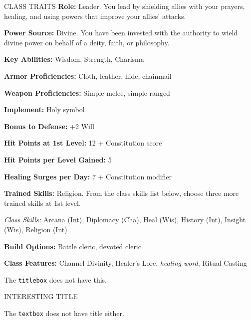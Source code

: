 \documentclass{article}
\begin{document}
\begin{traitsbox}{CLASS TRAITS}
	\textbf{Role:} Leader. You lead by shielding allies with your prayers, healing, and using powers that improve your allies’ attacks.


	\textbf{Power Source:} Divine. You have been invested with the authority to wield divine power on behalf of a deity, faith, or philosophy.

	\textbf{Key Abilities:} Wisdom, Strength, Charisma

	\vspace{1em}

	\textbf{Armor Proficiencies:} Cloth, leather, hide, chainmail

	\textbf{Weapon Proficiencies:} Simple melee, simple ranged

	\textbf{Implement:} Holy symbol

	\textbf{Bonus to Defense:} +2 Will

	\vspace{1em}

	\textbf{Hit Points at 1st Level:} 12 + Constitution score

	\textbf{Hit Points per Level Gained:} 5

	\textbf{Healing Surges per Day:} 7 + Constitution modifier

	\vspace{1em}

	\textbf{Trained Skills:} Religion. From the class skills list below, choose three more trained skills at 1st level.

	\noindent\textit{Class Skills:} Arcana (Int), Diplomacy (Cha), Heal (Wis), History (Int), Insight (Wis), Religion (Int)

	\vspace{1em}

	\textbf{Build Options:} Battle cleric, devoted cleric

	\textbf{Class Features:} Channel Divinity, Healer’s Lore, \textit{healing word}, Ritual Casting

	\vspace{1em}
\end{traitsbox}

The \texttt{titlebox} does not have this.


\begin{titlebox}{INTERESTING TITLE}
	\lipsum[][1-5]
\end{titlebox}

The \texttt{textbox} does not have title either.
\end{document}
